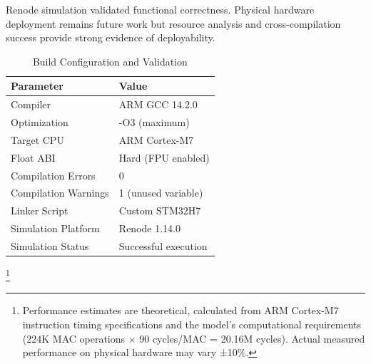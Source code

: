 Renode simulation validated functional correctness. Physical hardware
deployment remains future work but resource analysis and cross-compilation
success provide strong evidence of deployability.






\begin{table}[h]
\centering
\caption{Build Configuration and Validation}
\label{tab:build_config}
\begin{tabular}{ll}
\hline
\textbf{Parameter} & \textbf{Value} \\
\hline
Compiler           & ARM GCC 14.2.0 \\
Optimization       & -O3 (maximum) \\
Target CPU         & ARM Cortex-M7 \\
Float ABI          & Hard (FPU enabled) \\
Compilation Errors & 0 \\
Compilation Warnings & 1 (unused variable) \\
Linker Script      & Custom STM32H7 \\
Simulation Platform & Renode 1.14.0 \\
Simulation Status  & Successful execution \\
\hline
\end{tabular}
\end{table}



\footnote{Performance estimates are theoretical, calculated from ARM
Cortex-M7 instruction timing specifications and the model's computational
requirements (224K MAC operations × 90 cycles/MAC = 20.16M cycles).
Actual measured performance on physical hardware may vary ±10\%.}

